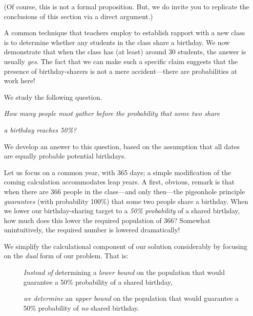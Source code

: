 \smallskip

\noindent
(Of course, this is not a formal  proposition. But, we do invite you to replicate the conclusions of this section via a direct argument.)

\bigskip

A common technique that teachers employ to establish rapport with a new class is to determine whether any students in the class share a birthday.  We now demonstrate that when the class has (at least) around 30 students, the answer is usually \textit{yes}.  The fact that we can make such a specific claim suggests that the presence of birthday-sharers is not a mere accident---there are probabilities at work here!

\medskip

\noindent
We study the following question.

\smallskip

{\it How many people must gather before the probability that some two share}

{\it a birthday reaches 50\%?}

\medskip

\noindent
We develop an answer to this question, based on the assumption that all dates are equally probable potential birthdays.

\bigskip

Let us focus on a common year, with 365 days; a simple modification of the coming calculation 
accommodates leap years.  A first, obvious, remark is that when there are 366 people in the 
class---and only then---the pigeonhole principle {\em guarantees} (with probability 100\%)  that some two people share a birthday.  When we lower our birthday-sharing target to a  {\em 50\% probability} of a shared birthday, how much does this lower the required population  of 366?  Somewhat unintuitively, the required number is lowered dramatically!

\bigskip

We simplify the calculational component of our solution considerably by focusing on the  {\em dual} form of our problem.  That is:

\begin{description}
\item[]
{\em Instead of} determining a {\em lower bound} on the population that would guarantee a 50\% probability of a shared birthday,

\item[]
{\em we determine} an {\em upper bound} on the population that would guarantee a 50\% probability of {\em no} shared birthday.
\end{description}

